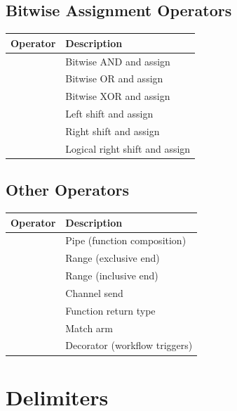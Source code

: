 \subsection{Bitwise Assignment Operators}

\begin{table}[h]
\centering
\begin{tabular}{ll}
\toprule
\textbf{Operator} & \textbf{Description} \\
\midrule
\code{\&=} & Bitwise AND and assign \\
\code{|=} & Bitwise OR and assign \\
\code{\^{}=} & Bitwise XOR and assign \\
\code{<<=} & Left shift and assign \\
\code{>>=} & Right shift and assign \\
\code{>>>=} & Logical right shift and assign \\
\bottomrule
\end{tabular}
\end{table}

\subsection{Other Operators}

\begin{table}[h]
\centering
\begin{tabular}{ll}
\toprule
\textbf{Operator} & \textbf{Description} \\
\midrule
\code{|>} & Pipe (function composition) \\
\code{..} & Range (exclusive end) \\
\code{..=} & Range (inclusive end) \\
\code{<-} & Channel send \\
\code{->} & Function return type \\
\code{=>} & Match arm \\
\code{@} & Decorator (workflow triggers) \\
\bottomrule
\end{tabular}
\end{table}

\section{Delimiters}

